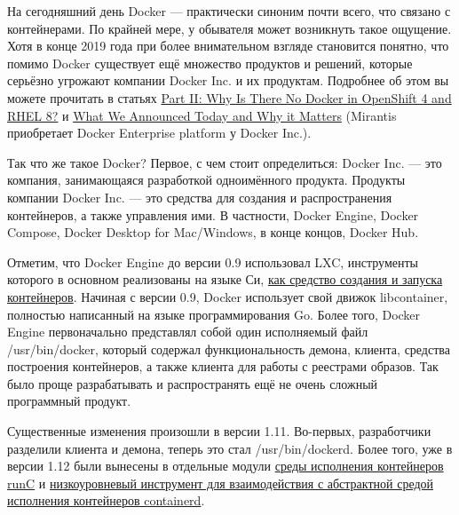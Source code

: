\documentclass[14pt, a4paper]{article}
\begin{document}
На сегодняшний день Docker — практически синоним почти всего, что связано с контейнерами. По
крайней мере, у обывателя может возникнуть такое ощущение. Хотя в конце 2019 года при более
внимательном взгляде становится понятно, что помимо Docker существует ещё множество продуктов
и решений, которые серьёзно угрожают компании Docker Inc. и их продуктам. Подробнее об этом вы
можете прочитать в статьях \href{http://crunchtools.com/why-no-docker/?preview=true&frame-nonce=388d01a716}{Part II: Why Is There No Docker in OpenShift 4 and RHEL 8?} и \href{https://www.mirantis.com/blog/mirantis-acquires-docker-enterprise-platform-business/}{What We
Announced Today and Why it Matters} (Mirantis приобретает Docker Enterprise platform у Docker Inc.).

Так что же такое Docker? Первое, с чем стоит определиться: Docker Inc. — это компания,
занимающаяся разработкой одноимённого продукта. Продукты компании Docker Inc. — это средства
для создания и распространения контейнеров, а также управления ими. В частности, Docker Engine,
Docker Compose, Docker Desktop for Mac/Windows, в конце концов, Docker Hub.

Отметим, что Docker Engine до версии 0.9 использовал LXC, инструменты которого в основном
реализованы на языке Си, \href{https://www.docker.com/blog/docker-0-9-introducing-execution-drivers-and-libcontainer}{как средство создания и запуска контейнеров}. Начиная с версии 0.9,
Docker использует свой движок libcontainer, полностью написанный на языке программирования Go.
Более того, Docker Engine первоначально представлял собой один исполняемый файл /usr/bin/docker,
который содержал функциональность демона, клиента, средства построения контейнеров, а также
клиента для работы с реестрами образов. Так было проще разрабатывать и распространять ещё не
очень сложный программный продукт.

Существенные изменения произошли в версии 1.11. Во-первых, разработчики разделили клиента и
демона, теперь это стал /usr/bin/dockerd. Более того, уже в версии 1.12 были вынесены в отдельные
модули \href{https://github.com/opencontainers/runc}{среды исполнения контейнеров runC} и \href{https://github.com/docker-archive/containerd}{низкоуровневый инструмент для взаимодействия с
абстрактной средой исполнения контейнеров containerd}.
\end{document}
